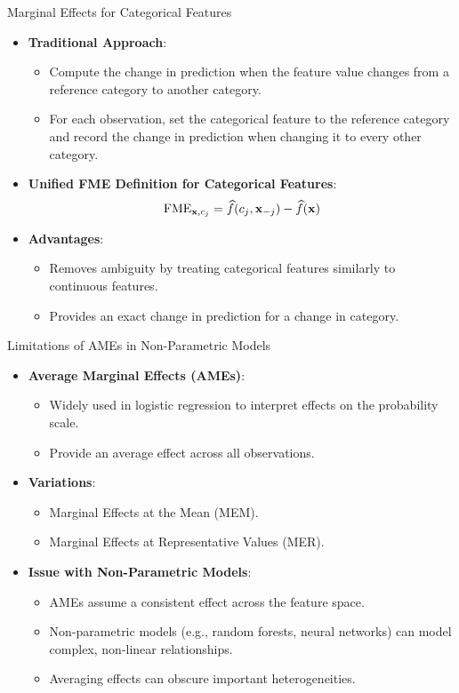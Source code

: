 \documentclass[10pt,compress,t,notes=noshow, xcolor=table]{beamer}
\begin{document}
\begin{frame}{Marginal Effects for Categorical Features}
\begin{itemize}
\item \textbf{Traditional Approach}:
\begin{itemize}
\item Compute the change in prediction when the feature value changes from a reference category to another category.
\item For each observation, set the categorical feature to the reference category and record the change in prediction when changing it to every other category.
\end{itemize}
\item \textbf{Unified FME Definition for Categorical Features}:
\[
\text{FME}_{\mathbf{x}, c_j} = \widehat{f}(c_j, \mathbf{x}_{-j}) - \widehat{f}(\mathbf{x})
\]
\item \textbf{Advantages}:
\begin{itemize}
\item Removes ambiguity by treating categorical features similarly to continuous features.
\item Provides an exact change in prediction for a change in category.
\end{itemize}
\end{itemize}
\end{frame}


\begin{frame}{Limitations of AMEs in Non-Parametric Models}
\begin{itemize}
\item \textbf{Average Marginal Effects (AMEs)}:
\begin{itemize}
\item Widely used in logistic regression to interpret effects on the probability scale.
\item Provide an average effect across all observations.
\end{itemize}
\item \textbf{Variations}:
\begin{itemize}
\item Marginal Effects at the Mean (MEM).
\item Marginal Effects at Representative Values (MER).
\end{itemize}
\item \textbf{Issue with Non-Parametric Models}:
\begin{itemize}
\item AMEs assume a consistent effect across the feature space.
\item Non-parametric models (e.g., random forests, neural networks) can model complex, non-linear relationships.
\item Averaging effects can obscure important heterogeneities.
\end{itemize}
\end{itemize}
\end{frame}
\end{document}
